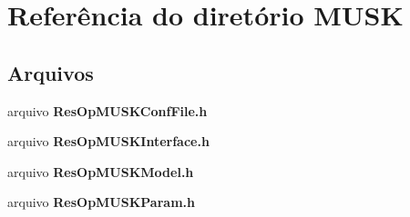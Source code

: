 \section{Referência do diretório M\+U\+SK}
\label{dir_6b0ef71119ad2e8063c53584e0ff8375}
\subsection*{Arquivos}
\begin{DoxyCompactItemize}
\item 
arquivo {\bf Res\+Op\+M\+U\+S\+K\+Conf\+File.\+h}
\item 
arquivo {\bf Res\+Op\+M\+U\+S\+K\+Interface.\+h}
\item 
arquivo {\bf Res\+Op\+M\+U\+S\+K\+Model.\+h}
\item 
arquivo {\bf Res\+Op\+M\+U\+S\+K\+Param.\+h}
\end{DoxyCompactItemize}
